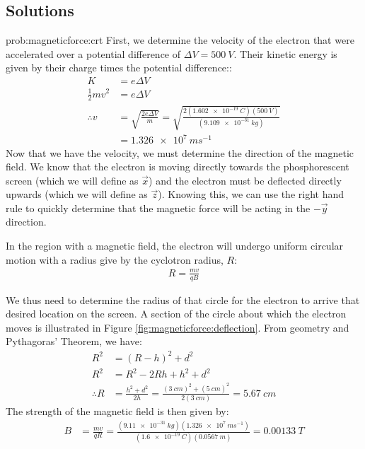 \newpage
\subsection{Solutions}
\begin{solution}{prob:magneticforce:crt}\label{soln:magneticforce:crt}
First, we determine the velocity of the electron that were accelerated over a potential difference of $\Delta V=\SI{500}{V}$. Their kinetic energy is given by their charge times the potential difference::
\begin{align*}
K &= e\Delta V \\
\frac{1}{2} mv^2 &= e\Delta V\\
\therefore v &= \sqrt{\frac{2e\Delta V}{m}}= \sqrt{\frac{2(\SI{1.602e-19}{C})(\SI{500}{V})}{(\SI{9.109e-31}{kg})}}\\
 &= \SI{1.326e7}{ms^{-1}}
\end{align*}
Now that we have the velocity, we must determine the direction of the magnetic field. We know that the electron is moving directly towards the phosphorescent screen (which we will define as $\vec x$) and the electron must be deflected directly upwards (which we will define as $\vec z$). Knowing this, we can use the right hand rule to quickly determine that the magnetic force will be acting in the $-\vec y$ direction. 

In the region with a magnetic field, the electron will undergo uniform circular motion with a radius give by the cyclotron radius, $R$:
\begin{align*}
R=\frac{mv}{qB}
\end{align*}

We thus need to determine the radius of that circle for the electron to arrive that desired location on the screen. A section of the circle about which the electron moves is illustrated in Figure \ref{fig:magneticforce:deflection}.
From geometry and Pythagoras' Theorem, we have:
\begin{align*}
R^2 &= (R-h)^2+d^2\\
R^2 &= R^2-2Rh+h^2+d^2\\
\therefore R &= \frac{h^2+d^2}{2h}=\frac{(\SI{3}{cm})^2+(\SI{5}{cm})^2}{2(\SI{3}{cm})}=\SI{5.67}{cm}
\end{align*}
The strength of the magnetic field is then given by:
\begin{align*}
B&=\frac{mv}{qR}=\frac{(\SI{9.11e-31}{kg})(\SI{1.326e7}{ms^{-1}})}{(\SI{1.6e-19}{C})(\SI{0.0567}{m})}=\SI{0.00133}{T}
\end{align*}
\end{solution}


